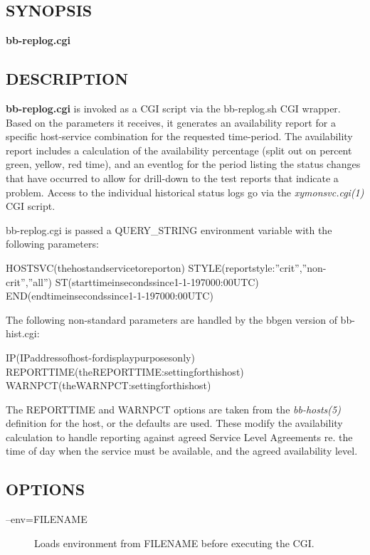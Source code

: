 \subsection{SYNOPSIS}
\textbf{bb-replog.cgi}


 
\subsection{DESCRIPTION}
\textbf{bb-replog.cgi}
 is invoked as a CGI script via the bb-replog.sh CGI wrapper. Based on
 the parameters it receives, it generates an availability report for a
 specific host-service combination for the requested time-period. The
 availability report includes a calculation of the availability
 percentage (split out on percent green, yellow, red time), and an
 eventlog for the period listing the status changes that have occurred
 to allow for drill-down to the test reports that indicate a
 problem. Access to the individual historical status logs go via the
 \emph{xymonsvc.cgi(1)} CGI script. 


  bb-replog.cgi is passed a QUERY\_STRING environment variable with the following parameters: 


  
HOSTSVC(thehostandservicetoreporton)  
STYLE(reportstyle:''crit'',''non-crit'',''all'')  
ST(starttimeinsecondssince1-1-197000:00UTC)  
END(endtimeinsecondssince1-1-197000:00UTC) 


  The following non-standard parameters are handled by the bbgen version of bb-hist.cgi: 


  
IP(IPaddressofhost-fordisplaypurposesonly)  
REPORTTIME(theREPORTTIME:settingforthishost)  
WARNPCT(theWARNPCT:settingforthishost) 


  The REPORTTIME and WARNPCT options are taken from the
  \emph{bb-hosts(5)} definition for the host, or the defaults are
  used. These modify the availability calculation to handle reporting
  against agreed Service Level Agreements re. the time of day when the
  service must be available, and the agreed availability level. 



 
\subsection{OPTIONS}
\begin{description}
\item[--env=FILENAME] Loads environment from FILENAME before executing the CGI. 

 


\end{description}
